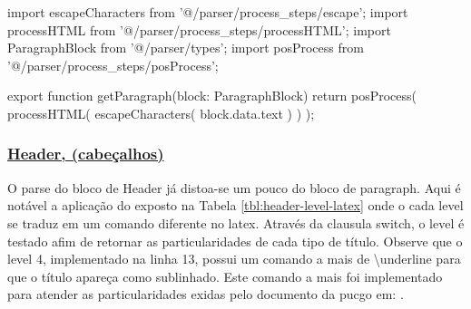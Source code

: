 \begin{getParagraphCode}
import { escapeCharacters } from '@/parser/process_steps/escape';
import { processHTML } from '@/parser/process_steps/processHTML';
import { ParagraphBlock } from '@/parser/types';
import { posProcess } from '@/parser/process_steps/posProcess';


export function getParagraph(block: ParagraphBlock){
    return posProcess(
        processHTML(
            escapeCharacters(
                block.data.text
            )
        )
    );
}
\end{getParagraphCode}

\subsubsection{\underline{Header, (cabeçalhos)}}

O parse do bloco de Header já distoa-se um pouco do bloco de paragraph.
Aqui é notável a aplicação do exposto na
Tabela \ref{tbl:header-level-latex}
onde o cada level se traduz em um comando diferente no latex. Através da
clausula switch, o level é testado afim de retornar as particularidades
de cada tipo de título. Observe que o level 4, implementado na linha 13,
possui um comando a mais de \textbackslash underline para que o título
apareça como sublinhado. Este comando a mais foi implementado
para atender as particularidades exidas pelo documento da
\acrshort{pucgo}
em:
\cite{pucgo}.


